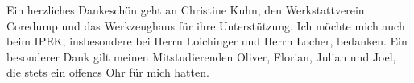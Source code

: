 
Ein herzliches Dankeschön geht an Christine Kuhn, den Werkstattverein Coredump und das Werkzeughaus für ihre Unterstützung. Ich möchte mich auch beim IPEK, insbesondere bei Herrn Loichinger und Herrn Locher, bedanken. Ein besonderer Dank gilt meinen Mitstudierenden Oliver, Florian, Julian und Joel, die stets ein offenes Ohr für mich hatten.
